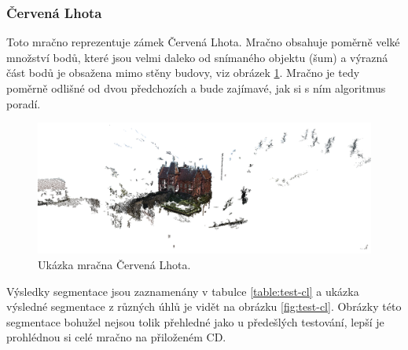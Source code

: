 \documentclass[11pt,twoside,a4paper]{book}
\begin{document}
\cleardoublepage
\subsubsection{Červená Lhota}

Toto mračno reprezentuje zámek Červená Lhota. Mračno obsahuje poměrně velké množ\-ství bodů, které jsou velmi daleko od snímaného objektu (šum) a výrazná část bodů je obsažena mimo stěny budovy, viz obrázek \ref{fig:cervena-lhota}. Mračno je tedy poměrně odlišné od dvou předchozích a bude zajímavé, jak si s ním algoritmus poradí.

\begin{figure}[H]
\begin{center}
\includegraphics[width=\textwidth]{figures/cervena-lhota}
\caption{Ukázka mračna Červená Lhota.}
\label{fig:cervena-lhota}
\end{center}
\end{figure}

Výsledky segmentace jsou zaznamenány v tabulce \ref{table:test-cl} a ukázka výsledné segmentace z různých úhlů je vidět na obrázku \ref{fig:test-cl}. Obrázky této segmentace bohužel nejsou tolik přehledné jako u předešlých testování, lepší je prohlédnou si celé mračno na přiloženém CD.
\end{document}
